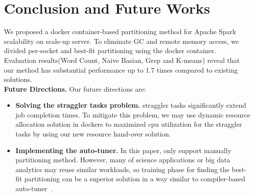 \section{Conclusion and Future Works}

\ifkor
We proposed a docker container-based partitioning method for Apache
Spark scalability on scale-up server.
To eliminate GC and remote memory access, we divided per-socket and best-fit partitioning
using the docker container.
Evaluation results(Word Count, Naive Basian, Grep and K-means) reveal
that our method has substantial performance up to 1.7 times compared to existing
solutions.
\newline\\
\noindent
\textbf{Future Directions.} Our future directions are:
\begin{itemize}
\item \textbf{Solving the straggler tasks problem.} straggler tasks
significantly extend job completion times.
To mitigate this problem, we may use dynamic resource allocation solution in
dockers to maximized cpu utilization for the straggler tasks by using our new
resource hand-over solution.
\item \textbf{Implementing the auto-tuner.} In this paper, only support manually
partitioning method. However, many of science applications or big data analytics 
may reuse similar workloads, so training phase for finding the best-fit
partitioning can be a superior solution in a way similar to compiler-based auto-tuner~\cite{Ansel2014OEF}.

\end{itemize}

\else

\fi
